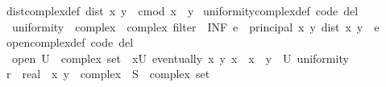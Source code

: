 \begin{isabellebody}
\isanewline
{}\isamarkupfalse%
\ dist{\isacharunderscore}{\kern0pt}complex{\isacharunderscore}{\kern0pt}def{\isacharcolon}{\kern0pt}\ {\isachardoublequoteopen}dist\ x\ y\ {\isacharequal}{\kern0pt}\ cmod\ {\isacharparenleft}{\kern0pt}x\ {\isacharminus}{\kern0pt}\ y{\isacharparenright}{\kern0pt}{\isachardoublequoteclose}\isanewline
\isanewline
{}\isamarkupfalse%
\ uniformity{\isacharunderscore}{\kern0pt}complex{\isacharunderscore}{\kern0pt}def\ {\isacharbrackleft}{\kern0pt}code\ del{\isacharbrackright}{\kern0pt}{\isacharcolon}{\kern0pt}\isanewline
\ \ {\isachardoublequoteopen}{\isacharparenleft}{\kern0pt}uniformity\ {\isacharcolon}{\kern0pt}{\isacharcolon}{\kern0pt}\ {\isacharparenleft}{\kern0pt}complex\ {\isasymtimes}\ complex{\isacharparenright}{\kern0pt}\ filter{\isacharparenright}{\kern0pt}\ {\isacharequal}{\kern0pt}\ {\isacharparenleft}{\kern0pt}INF\ e{\isasymin}{\isacharbraceleft}{\kern0pt}{}\ {\isacharless}{\kern0pt}{\isachardot}{\kern0pt}{\isachardot}{\kern0pt}{\isacharbraceright}{\kern0pt}{\isachardot}{\kern0pt}\ principal\ {\isacharbraceleft}{\kern0pt}{\isacharparenleft}{\kern0pt}x{\isacharcomma}{\kern0pt}\ y{\isacharparenright}{\kern0pt}{\isachardot}{\kern0pt}\ dist\ x\ y\ {\isacharless}{\kern0pt}\ e{\isacharbraceright}{\kern0pt}{\isacharparenright}{\kern0pt}{\isachardoublequoteclose}\isanewline
\isanewline
{}\isamarkupfalse%
\ open{\isacharunderscore}{\kern0pt}complex{\isacharunderscore}{\kern0pt}def\ {\isacharbrackleft}{\kern0pt}code\ del{\isacharbrackright}{\kern0pt}{\isacharcolon}{\kern0pt}\isanewline
\ \ {\isachardoublequoteopen}open\ {\isacharparenleft}{\kern0pt}U\ {\isacharcolon}{\kern0pt}{\isacharcolon}{\kern0pt}\ complex\ set{\isacharparenright}{\kern0pt}\ {\isasymlongleftrightarrow}\ {\isacharparenleft}{\kern0pt}{\isasymforall}x{\isasymin}U{\isachardot}{\kern0pt}\ eventually\ {\isacharparenleft}{\kern0pt}{\isasymlambda}{\isacharparenleft}{\kern0pt}x{\isacharprime}{\kern0pt}{\isacharcomma}{\kern0pt}\ y{\isacharparenright}{\kern0pt}{\isachardot}{\kern0pt}\ x{\isacharprime}{\kern0pt}\ {\isacharequal}{\kern0pt}\ x\ {\isasymlongrightarrow}\ y\ {\isasymin}\ U{\isacharparenright}{\kern0pt}\ uniformity{\isacharparenright}{\kern0pt}{\isachardoublequoteclose}\isanewline
\isanewline
{}\isamarkupfalse%
\isanewline
%
\isadelimproof
%
\endisadelimproof
%
\isatagproof
{}\isamarkupfalse%
\isanewline
\ \ \isamarkupfalse%
\ r\ {\isacharcolon}{\kern0pt}{\isacharcolon}{\kern0pt}\ real\ \ x\ y\ {\isacharcolon}{\kern0pt}{\isacharcolon}{\kern0pt}\ complex\ \ S\ {\isacharcolon}{\kern0pt}{\isacharcolon}{\kern0pt}\ {\isachardoublequoteopen}complex\ set{\isachardoublequoteclose}\isanewline

\end{isabellebody}
